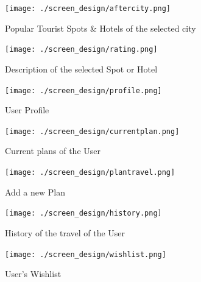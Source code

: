 \documentclass[a4paper,11pt]{article}
\begin{document}
\begin{figure}[ht!]
\hfill\texttt{[image: ./screen\_design/aftercity.png]}\hspace*{\fill}
\caption{Popular Tourist Spots \& Hotels of the selected city}
\end{figure}

\begin{figure}[ht!]
\hfill\texttt{[image: ./screen\_design/rating.png]}\hspace*{\fill}
\caption{Description of the selected Spot or Hotel}
\end{figure}

\begin{figure}[ht!]
\hfill\texttt{[image: ./screen\_design/profile.png]}\hspace*{\fill}
\caption{User Profile}
\end{figure}

\begin{figure}[ht!]
\hfill\texttt{[image: ./screen\_design/currentplan.png]}\hspace*{\fill}
\caption{Current plans of the User}
\end{figure}

\begin{figure}[ht!]
\hfill\texttt{[image: ./screen\_design/plantravel.png]}\hspace*{\fill}
\caption{Add a new Plan}
\end{figure}

\begin{figure}[ht!]
\hfill\texttt{[image: ./screen\_design/history.png]}\hspace*{\fill}
\caption{History of the travel of the User}
\end{figure}

\begin{figure}[ht!]
\hfill\texttt{[image: ./screen\_design/wishlist.png]}\hspace*{\fill}
\caption{User's Wishlist}
\end{figure}
\end{document}
